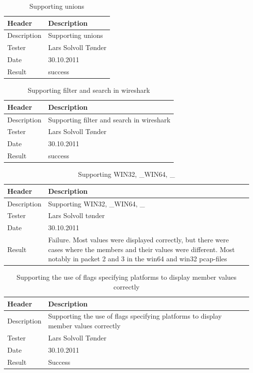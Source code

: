 \begin{table}[!htb] \footnotesize \center
\caption{Supporting unions\label{tab:sp3TID17}}
\begin{tabular}{l l}
	\toprule
	Header & Description \\
	\midrule
	Description & Supporting unions\\
	Tester & Lars Solvoll Tønder\\
	Date & 30.10.2011\\
	Result & success\\
	\bottomrule
\end{tabular}
\end{table}

\begin{table}[!htb] \footnotesize \center
\caption{Supporting filter and search in wireshark\label{tab:sp3TID18}}
\begin{tabular}{l l}
	\toprule
	Header & Description \\
	\midrule
	Description & Supporting filter and search in wireshark\\
	Tester & Lars Solvoll Tønder \\
	Date & 30.10.2011\\
	Result & success\\
	\bottomrule
\end{tabular}
\end{table}

\begin{table}[!htb] \footnotesize \center
\caption{Supporting WIN32, \_WIN64, \_ \label{tab:sp3TID19}}
\begin{tabular}{l l}
	\toprule
	Header & Description \\
	\midrule
	Description & Supporting WIN32, \_WIN64, \_\GLS{sparc} \\
	Tester & Lars Solvoll tønder\\
	Date & 30.10.2011\\
	Result & Failure. Most values were displayed correctly, but there were cases where the members and their values were different. Most notably in \gls{packet} 2 and 3 in the win64 and win32 \glspl{pcap-file} \\
	\bottomrule
\end{tabular}
\end{table}

\begin{table}[!htb] \footnotesize \center
\caption{Supporting the use of flags specifying platforms to display member values correctly \label{tab:sp3TID20}}
\begin{tabular}{l l}
	\toprule
	Header & Description \\
	\midrule
	Description & Supporting the use of flags specifying platforms to display member values correctly \\
	Tester & Lars Solvoll Tønder\\
	Date & 30.10.2011\\
	Result & Success\\
	\bottomrule
\end{tabular}
\end{table}

